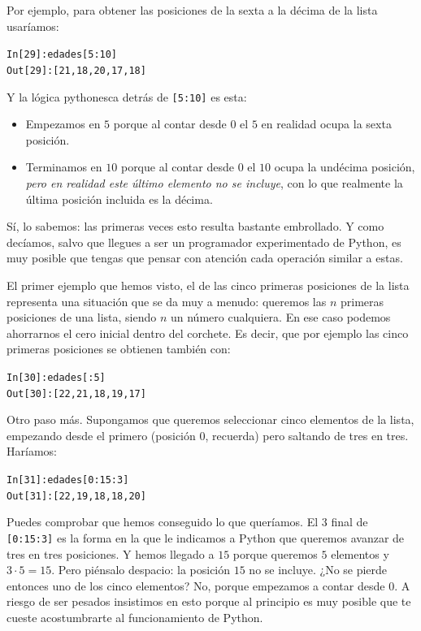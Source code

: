 \documentclass[10pt,a4paper]{article}\usepackage[]{graphicx}\usepackage[]{color}
\makeatletter
\newenvironment{kframe}{%
 \def\at@end@of@kframe{}%
 \ifinner\ifhmode%
  \def\at@end@of@kframe{\end{minipage}}%
  \begin{minipage}{\columnwidth}%
 \fi\fi%
 \def\FrameCommand##1{\hskip\@totalleftmargin \hskip-\fboxsep
 \colorbox{shadecolor}{##1}\hskip-\fboxsep
     \hskip-\linewidth \hskip-\@totalleftmargin \hskip\columnwidth}%
 \MakeFramed {\advance\hsize-\width
   \@totalleftmargin\z@ \linewidth\hsize
   \@setminipage}}%
 {\par\unskip\endMakeFramed%
 \at@end@of@kframe}
\newenvironment{knitrout}{}{} %
\newcounter {cont01}
\makeatother
\begin{document}
Por ejemplo, para obtener las posiciones de la sexta a la décima de la lista usaríamos:
\begin{knitrout}
\color{fgcolor}\begin{kframe}
\begin{alltt}
In [29]: edades[5:10]
Out[29]: [21, 18, 20, 17, 18]
\end{alltt}
\end{kframe}
\end{knitrout}
Y la lógica pythonesca detrás de {\tt [5:10]} es esta:
\begin{itemize}
\item Empezamos en $5$ porque al contar desde $0$ el $5$ en realidad ocupa la sexta posición.
\item Terminamos en $10$ porque al contar desde $0$ el $10$ ocupa la undécima posición, {\em pero en realidad este último elemento no se incluye}, con lo que realmente la última posición incluida es la décima.
\end{itemize}
Sí, lo sabemos: las primeras veces esto resulta bastante embrollado. Y como decíamos, salvo que llegues a ser un programador experimentado de Python, es muy posible que tengas que pensar con atención cada operación similar a estas.

El primer ejemplo que hemos visto, el de las cinco primeras posiciones de la lista representa una situación que se da muy a menudo: queremos las $n$ primeras posiciones de una lista, siendo $n$ un número cualquiera. En ese caso podemos ahorrarnos el cero inicial dentro del corchete. Es decir, que
por ejemplo las cinco primeras posiciones se obtienen también con:
\begin{knitrout}
\color{fgcolor}\begin{kframe}
\begin{alltt}
In [30]: edades[:5]
Out[30]: [22, 21, 18, 19, 17]
\end{alltt}
\end{kframe}
\end{knitrout}

Otro paso más. Supongamos que queremos seleccionar cinco elementos de la lista, empezando desde el primero (posición $0$, recuerda) pero saltando de tres en tres. Haríamos:
\begin{knitrout}
\color{fgcolor}\begin{kframe}
\begin{alltt}
In [31]: edades[0:15:3]
Out[31]: [22, 19, 18, 18, 20]
\end{alltt}
\end{kframe}
\end{knitrout}
Puedes comprobar que hemos conseguido lo que queríamos. El $3$ final de {\tt [0:15:3]} es la forma en la que le indicamos a Python que queremos avanzar de tres en tres posiciones. Y hemos llegado a $15$ porque queremos $5$ elementos y $3\cdot 5= 15$. Pero piénsalo despacio: la posición $15$ no se incluye. ¿No se pierde entonces uno de los cinco elementos? No, porque empezamos a contar desde $0$. A riesgo de ser pesados insistimos en esto porque al principio es muy posible que te cueste acostumbrarte al funcionamiento de Python.
\end{document}
